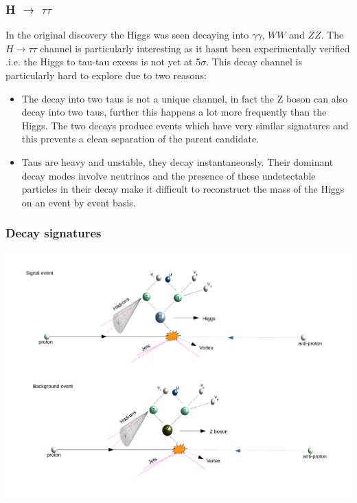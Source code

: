\documentclass[pdf]{beamer}
\begin{document}
\begin{frame}
\frametitle{H $\rightarrow$ $\tau\tau$}
In the original discovery the Higgs was seen decaying into $\gamma\gamma$, $WW$ and $ZZ$. The $H\rightarrow \tau\tau$ channel is particularly interesting as it hasnt been experimentally verified .i.e. the Higgs to tau-tau excess is not yet at
5$\sigma$.
This decay channel is particularly hard to explore due to two reasons:
\begin{itemize}
\item<1-> The decay into two taus is not a unique channel, in fact the Z boson can also decay into two taus, further this happens a lot more frequently than the Higgs. The two decays produce events which have very similar signatures and this prevents a clean separation of the parent candidate.
\item<2-> Taus are heavy and unstable, they decay instantaneously. Their dominant decay modes involve neutrinos and the presence of these undetectable particles in their decay make it difficult to reconstruct the mass of the Higgs on an event by event basis.
\end{itemize}
\end{frame}

\begin{frame}
\frametitle{Decay signatures}
\includegraphics[scale=0.4]{higgs_decay.pdf}
\end{frame}
\end{document}
